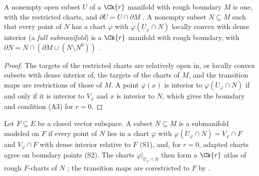 \begin{proposition}
  \label{prop:rough-full-submanifold}
  \leanok
  A nonempty open subset $U$ of a $\Ck{r}$ manifold with rough boundary $M$ is one, with the
  restricted charts, and $\partial U = U \cap \partial M$ \cite[Example 3.5.4, p.~279]{GN26}. A
  nonempty subset $N \subseteq M$ such that every point of $N$ has a chart $\varphi$ with
  $\varphi(U_\varphi \cap N)$ locally convex with dense interior (a \emph{full submanifold}) is a
  $\Ck{r}$ manifold with rough boundary, with
  $\partial N = N \cap (\partial M \cup (N \setminus N^0))$
  \cite[Definition 3.5.19 and (3.24), p.~284]{GN26}.
\end{proposition}

\begin{proof}
  \leanok
  The targets of the restricted charts are relatively open in, or locally convex subsets with
  dense interior of, the targets of the charts of $M$, and the transition maps are restrictions of
  those of $M$. A point $\varphi(x)$ is interior to $\varphi(U_\varphi \cap N)$ if and only if it is
  interior to $V_\varphi$ and $x$ is interior to $N$, which gives the boundary and condition (A3)
  for $r = 0$.
\end{proof}

\begin{definition}
  \label{def:rough-submanifold}
  \leanok
  Let $F \subseteq E$ be a closed vector subspace. A subset $N \subseteq M$ is a submanifold
  modeled on $F$ if every point of $N$ lies in a chart $\varphi$ with
  $\varphi(U_\varphi \cap N) = V_\varphi \cap F$ and $V_\varphi \cap F$ with dense interior relative to
  $F$ (S1), and, for $r = 0$, adapted charts agree on boundary points (S2). The charts
  $\varphi|_{U_\varphi \cap N}$ then form a $\Ck{r}$ atlas of rough $F$-charts of $N$
  \cite[Definition 3.5.14 and Remark 3.5.16, pp.~282--283]{GN26}; the transition maps are
  corestricted to $F$ by \cite[Lemma 1.4.16]{GN26}.
\end{definition}

